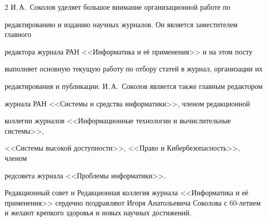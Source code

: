 \begin{multicols}{2}
И.\,А.~Соколов уделяет большое внимание организационной работе по

редактированию и изданию научных журналов. Он является заместителем главного

редактора журнала РАН <<Информатика и её применения>> и на этом посту

выполняет основную текущую работу по отбору статей в журнал, организации их

редактирования и публикации. И.\,А.~Соколов является также главным редактором

журнала РАН <<Системы и средства информатики>>, членом редакционной

коллегии журналов <<Информационные технологии и вычислительные системы>>,

<<Сис\-те\-мы высокой доступности>>, <<Право и Кибербезопасность>>, членом

редсовета журнала <<Проб\-ле\-мы информатики>>.



\bigskip



Редакционный совет и Редакционная коллегия журнала <<Информатика и её применения>> сердечно поздравляют Игоря Анатольевича Соколова с 60-ле\-ти\-ем и желают крепкого здоровья и новых научных достижений.





\label{end\stat}





\end{multicols}




